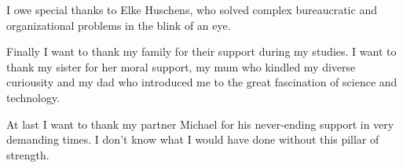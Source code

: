 	I owe special thanks to Elke Huschens, who solved complex bureaucratic and organizational problems in the blink of an eye.

	Finally I want to thank my family for their support during my studies. I want to thank my sister for her moral support, my mum who kindled my diverse curiousity and my dad who introduced me to the great fascination of science and technology.
	
	At last I want to thank my partner Michael for his never-ending support in very demanding times. I don't know what I would have done without this pillar of strength.

	\blindtext

\vfill